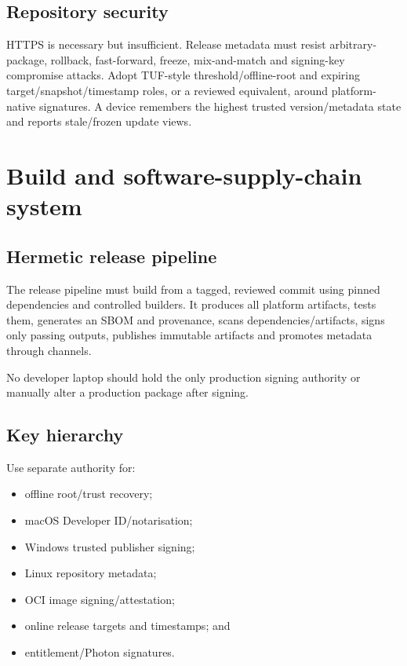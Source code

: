 \documentclass[11pt]{article}
\begin{document}
\subsection{Repository security}

HTTPS is necessary but insufficient. Release metadata must resist arbitrary-package, rollback, fast-forward, freeze, mix-and-match and signing-key compromise attacks. Adopt TUF-style threshold/offline-root and expiring target/snapshot/timestamp roles, or a reviewed equivalent, around platform-native signatures. A device remembers the highest trusted version/metadata state and reports stale/frozen update views.

\section{Build and software-supply-chain system}

\subsection{Hermetic release pipeline}

The release pipeline must build from a tagged, reviewed commit using pinned dependencies and controlled builders. It produces all platform artifacts, tests them, generates an SBOM and provenance, scans dependencies/artifacts, signs only passing outputs, publishes immutable artifacts and promotes metadata through channels.

No developer laptop should hold the only production signing authority or manually alter a production package after signing.

\subsection{Key hierarchy}

Use separate authority for:

\begin{itemize}
  \item offline root/trust recovery;
  \item macOS Developer ID/notarisation;
  \item Windows trusted publisher signing;
  \item Linux repository metadata;
  \item OCI image signing/attestation;
  \item online release targets and timestamps; and
  \item entitlement/Photon signatures.
\end{itemize}
\end{document}
